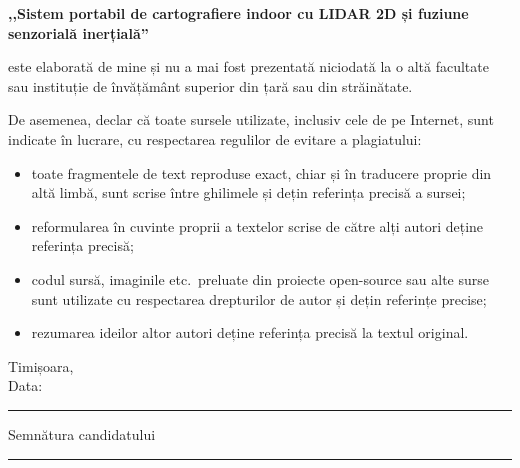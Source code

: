 \documentclass[a4paper,12pt,twoside,openany]{report}
\newcommand{\workTitle}{Sistem portabil de cartografiere indoor cu LIDAR 2D și fuziune senzorială inerțială}
\begin{document}
\medskip

\noindent\textbf{,,\workTitle{}''}

\medskip

\noindent este elaborată de mine și nu a mai fost prezentată niciodată la
o altă facultate sau instituție de învățământ superior din țară sau din
străinătate.

\medskip

\noindent De asemenea, declar că toate sursele utilizate, inclusiv cele de
pe Internet, sunt indicate în lucrare, cu respectarea regulilor de evitare
a plagiatului:
\begin{itemize}\itemsep0pt
    \item toate fragmentele de text reproduse exact, chiar și în
          traducere proprie din altă limbă, sunt scrise între ghilimele
          și dețin referința precisă a sursei;
    \item reformularea în cuvinte proprii a textelor scrise de către alți
          autori deține referința precisă;
    \item codul sursă, imaginile etc.\ preluate din proiecte open-source
          sau alte surse sunt utilizate cu respectarea drepturilor de
          autor și dețin referințe precise;
    \item rezumarea ideilor altor autori deține referința precisă la
          textul original.
\end{itemize}

\vspace{1.5cm}

\noindent
\begin{minipage}[t]{0.5\textwidth}
    Timișoara,\\
    Data: \rule{4cm}{0.4pt}
\end{minipage}%
\begin{minipage}[t]{0.5\textwidth}
    Semnătura candidatului\\[1.0cm]
    \rule{5cm}{0.4pt}
\end{minipage}
\end{document}
